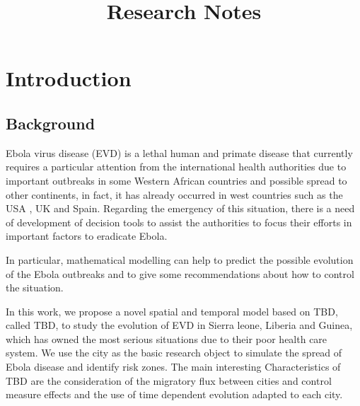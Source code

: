 \documentclass[12pt]{article}
\title{Research Notes}
\begin{document}
	\maketitle
	

\section{Introduction}
\subsection{Background}

Ebola virus disease (EVD) is a lethal human and primate disease that currently requires a particular attention from the international health authorities due to important outbreaks in some Western African countries and possible spread to other continents, in fact, it has already occurred in west countries such as the USA , UK and Spain. Regarding the emergency of this situation, there is a need of development of decision tools to assist the authorities to focus their efforts in important factors to eradicate Ebola.

In particular, mathematical modelling can help to predict the possible evolution of the Ebola outbreaks and to give some recommendations about how to control the situation.

In this work, we propose a novel spatial and temporal model based on TBD, called TBD, to study the evolution of EVD in Sierra leone, Liberia and Guinea, which has owned the most serious situations due to their poor health care system. We use the city as the basic research object to simulate the spread of Ebola disease and identify risk zones. The main interesting Characteristics of TBD are the consideration of the migratory flux between cities and control measure effects and the use of time dependent evolution adapted to each city.
\end{document}

